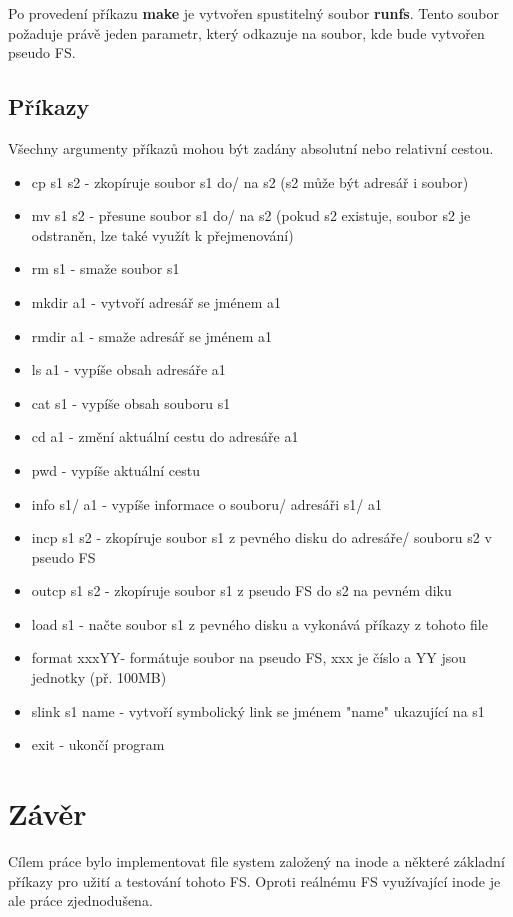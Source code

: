 \documentclass[12pt]{report}
\begin{document}
Po provedení příkazu \textbf{make} je vytvořen spustitelný soubor \textbf{runfs}. Tento soubor 
požaduje právě jeden parametr, který odkazuje na soubor, kde bude vytvořen pseudo FS.
%
\section{Příkazy}
Všechny argumenty příkazů mohou být zadány absolutní nebo relativní cestou.
\begin{itemize}
	\item cp s1 s2 - zkopíruje soubor s1 do/ na s2 (s2 může být adresář i soubor)
	\item mv s1 s2 - přesune soubor s1 do/ na s2 (pokud s2 existuje, soubor s2 je odstraněn,
		lze také využít k přejmenování)
	\item rm s1 - smaže soubor s1
	\item mkdir a1 - vytvoří adresář se jménem a1
	\item rmdir a1 - smaže adresář se jménem a1
	\item ls a1 - vypíše obsah adresáře a1
	\item cat s1 - vypíše obsah souboru s1
	\item cd a1 - změní aktuální cestu do adresáře a1
	\item pwd - vypíše aktuální cestu
	\item info s1/ a1 - vypíše informace o souboru/ adresáři s1/ a1
	\item incp s1 s2 - zkopíruje soubor s1 z pevného disku do adresáře/ souboru s2 v pseudo FS
	\item outcp s1 s2 - zkopíruje soubor s1 z pseudo FS do s2 na pevném diku
	\item load s1 - načte soubor s1 z pevného disku a vykonává příkazy z tohoto file
	\item format xxxYY- formátuje soubor na pseudo FS, xxx je číslo a YY jsou jednotky (př. 100MB)
	\item slink s1 name - vytvoří symbolický link se jménem "name" ukazující na s1
	\item exit - ukončí program
\end{itemize}

%
%
\chapter{Závěr}
Cílem práce bylo implementovat file system založený na inode a některé základní příkazy 
pro užití a testování tohoto FS. Oproti reálnému FS využívající inode je ale práce zjednodušena.
\end{document}
